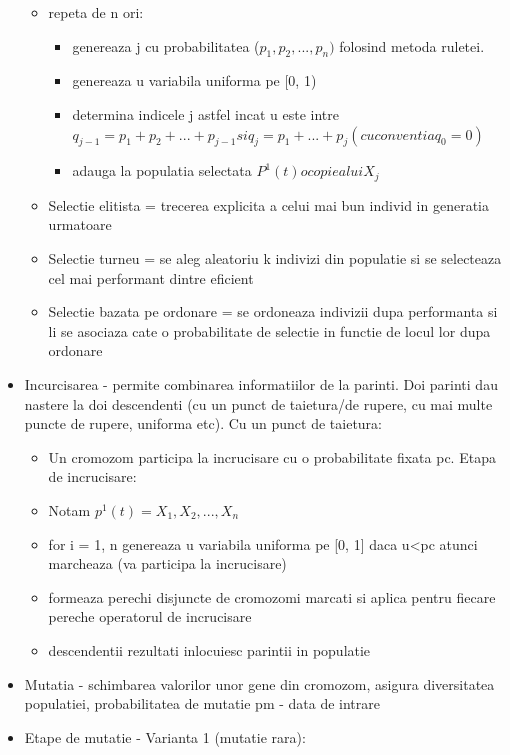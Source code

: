 \documentclass[a4paper]{article}
\begin{document}
\begin{multicols}{2}
\begin{itemize}
\begin{itemize}
    \item repeta de n ori:
    \begin{itemize}
    \item genereaza j cu probabilitatea ($p_1, p_2,...,p_n)$ folosind metoda ruletei.
    \item genereaza u variabila uniforma pe [0, 1)
    \item determina indicele j astfel incat u este intre $q_{j-1} = p_1 + p_2 + ... + p_{j-1} si q_j = p_1 + ... + p_j (cu conventia q_0 = 0)$
    \item adauga la populatia selectata $P^1(t) o copie a lui X_j$
    \end{itemize}
    \end{itemize}
    \begin{itemize}
    \item Selectie elitista = trecerea explicita a celui mai bun individ in generatia urmatoare
    \item Selectie turneu = se aleg aleatoriu k indivizi din populatie si se selecteaza cel mai performant dintre eficient
    \item Selectie bazata pe ordonare = se ordoneaza indivizii dupa performanta si li se asociaza cate o probabilitate de selectie in functie de locul lor dupa ordonare
    \end{itemize}
    \item Incurcisarea - permite combinarea informatiilor de la parinti. Doi parinti dau nastere la doi descendenti (cu un punct de taietura/de rupere, cu mai multe puncte de rupere, uniforma etc). Cu un punct de taietura:
    \begin{itemize}
    \item Un cromozom participa la incrucisare cu o probabilitate fixata pc. Etapa de incrucisare:
    \item Notam $p^1(t) = {X_1, X_2,...,X_n}$
    \item for i = 1, n genereaza u variabila uniforma pe [0, 1] daca u<pc atunci marcheaza (va participa la incrucisare)
    \item formeaza perechi disjuncte de cromozomi marcati si aplica pentru fiecare pereche operatorul de incrucisare
    \item descendentii rezultati inlocuiesc parintii in populatie
    \end{itemize}
    \item Mutatia - schimbarea valorilor unor gene din cromozom, asigura diversitatea populatiei, probabilitatea de mutatie pm - data de intrare
    \item Etape de mutatie - Varianta 1 (mutatie rara):

\end{itemize}
\end{multicols}
\end{document}
